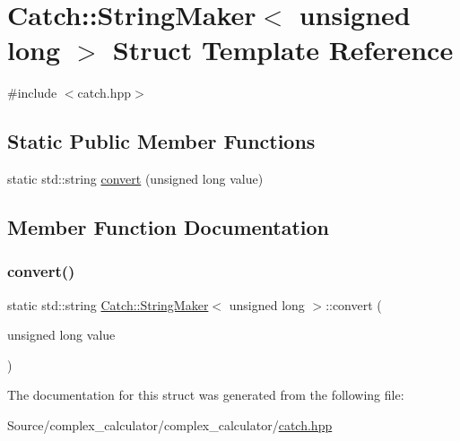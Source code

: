 \hypertarget{struct_catch_1_1_string_maker_3_01unsigned_01long_01_4}{}\section{Catch\+:\+:String\+Maker$<$ unsigned long $>$ Struct Template Reference}
\label{struct_catch_1_1_string_maker_3_01unsigned_01long_01_4}


{\ttfamily \#include $<$catch.\+hpp$>$}

\subsection*{Static Public Member Functions}
\begin{DoxyCompactItemize}
\item 
static std\+::string \mbox{\hyperlink{struct_catch_1_1_string_maker_3_01unsigned_01long_01_4_ae105dc97e4462a86a61b59667f8423c9}{convert}} (unsigned long value)
\end{DoxyCompactItemize}


\subsection{Member Function Documentation}
\mbox{\label{struct_catch_1_1_string_maker_3_01unsigned_01long_01_4_ae105dc97e4462a86a61b59667f8423c9}} 
\subsubsection{\texorpdfstring{convert()}{convert()}}
{\footnotesize\ttfamily static std\+::string \mbox{\hyperlink{struct_catch_1_1_string_maker}{Catch\+::\+String\+Maker}}$<$ unsigned long $>$\+::convert (\begin{DoxyParamCaption}\item[{unsigned long}]{value }\end{DoxyParamCaption})\hspace{0.3cm}{\ttfamily [static]}}



The documentation for this struct was generated from the following file\+:\begin{DoxyCompactItemize}
\item 
Source/complex\+\_\+calculator/complex\+\_\+calculator/\mbox{\hyperlink{catch_8hpp}{catch.\+hpp}}\end{DoxyCompactItemize}
